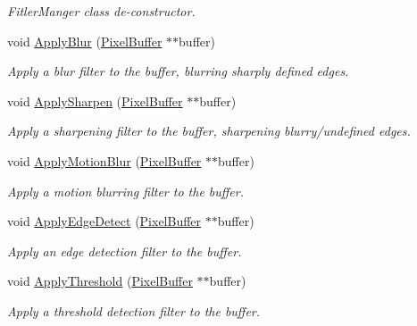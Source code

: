 \begin{DoxyCompactItemize}
\begin{DoxyCompactList}\small\item\em Fitler\+Manger class de-\/constructor. \end{DoxyCompactList}\item 
void \hyperlink{classimage__tools_1_1FilterManager_ab433819b81f5aea2940ccbd3342f37ab}{Apply\+Blur} (\hyperlink{classimage__tools_1_1PixelBuffer}{Pixel\+Buffer} $\ast$$\ast$buffer)
\begin{DoxyCompactList}\small\item\em Apply a blur filter to the buffer, blurring sharply defined edges. \end{DoxyCompactList}\item 
void \hyperlink{classimage__tools_1_1FilterManager_affd2d54947849f2be6c11585e1ce34b7}{Apply\+Sharpen} (\hyperlink{classimage__tools_1_1PixelBuffer}{Pixel\+Buffer} $\ast$$\ast$buffer)
\begin{DoxyCompactList}\small\item\em Apply a sharpening filter to the buffer, sharpening blurry/undefined edges. \end{DoxyCompactList}\item 
void \hyperlink{classimage__tools_1_1FilterManager_acd3651552af7abaeb4cf69ac90c62f0e}{Apply\+Motion\+Blur} (\hyperlink{classimage__tools_1_1PixelBuffer}{Pixel\+Buffer} $\ast$$\ast$buffer)
\begin{DoxyCompactList}\small\item\em Apply a motion blurring filter to the buffer. \end{DoxyCompactList}\item 
void \hyperlink{classimage__tools_1_1FilterManager_a111522b2042c253693195a73cb31a4a7}{Apply\+Edge\+Detect} (\hyperlink{classimage__tools_1_1PixelBuffer}{Pixel\+Buffer} $\ast$$\ast$buffer)
\begin{DoxyCompactList}\small\item\em Apply an edge detection filter to the buffer. \end{DoxyCompactList}\item 
void \hyperlink{classimage__tools_1_1FilterManager_aa62be1597d4a201a4a43fa62a462b2fc}{Apply\+Threshold} (\hyperlink{classimage__tools_1_1PixelBuffer}{Pixel\+Buffer} $\ast$$\ast$buffer)
\begin{DoxyCompactList}\small\item\em Apply a threshold detection filter to the buffer. \end{DoxyCompactList}\item 
$$
\end{DoxyCompactItemize}

